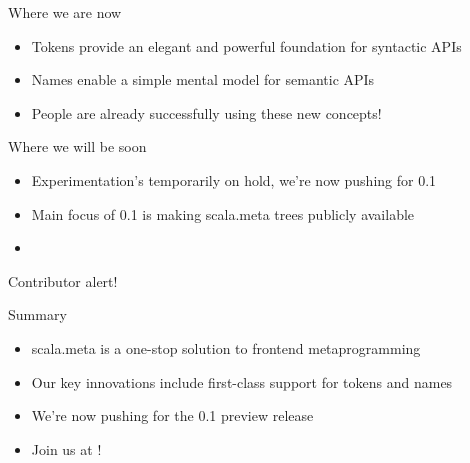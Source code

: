 \documentclass[svgnames,dvipsnames,hyperref={bookmarks=false},usepdftitle=false]{beamer}
\begin{document}
\begin{frame}{Where we are now}
\begin{itemize}
\item Tokens provide an elegant and powerful foundation for syntactic APIs
\item Names enable a simple mental model for semantic APIs
\item People are already successfully using these new concepts!
\end{itemize}
\end{frame}

\begin{frame}{Where we will be soon}
\vskip25pt
\begin{itemize}
\item Experimentation's temporarily on hold, we're now pushing for 0.1
\item Main focus of 0.1 is making scala.meta trees publicly available
\item {}
\end{itemize}
\pause
\vskip25pt
Contributor alert!\\
\end{frame}


\begin{frame}{Summary}
\begin{itemize}
\item scala.meta is a one-stop solution to frontend metaprogramming
\item Our key innovations include first-class support for tokens and names
\item We're now pushing for the 0.1 preview release
\item Join us at !
\end{itemize}
\end{frame}
\end{document}
